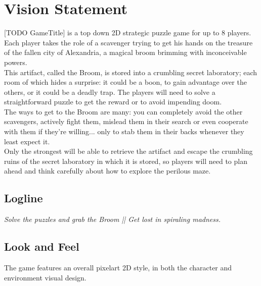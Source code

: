 \section{Vision Statement}

[TODO GameTitle] is a top down 2D strategic puzzle game for up to 8 players. \\

Each player takes the role of a scavenger trying to get his hands on the treasure of the fallen city of Alexandria, a magical broom brimming with inconceivable powers. \\

This artifact, called the Broom, is stored into a crumbling secret laboratory; each room of which hides a surprise: it could be a boon, to gain advantage over the others, or it could be a deadly trap. The players will need to solve a straightforward puzzle to get the reward or to avoid impending doom. \\

The ways to get to the Broom are many: you can completely avoid the other scavengers, actively fight them, mislead them in their search or even cooperate with them if they're willing... only to stab them in their backs whenever they least expect it. \\

Only the strongest will be able to retrieve the artifact and escape the crumbling ruins of the secret laboratory in which it is stored, so players will need to plan ahead and think carefully about how to explore the perilous maze.

\subsection{Logline}

\textit{Solve the puzzles and grab the Broom || Get lost in spiraling madness.}

\subsection{Look and Feel}

The game features an overall pixelart 2D style, in both the character and environment visual design. 




